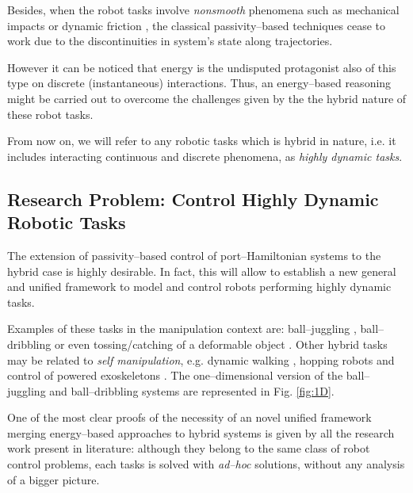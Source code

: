 %
Besides, when the robot tasks involve \textit{nonsmooth} phenomena such as mechanical impacts or dynamic friction \cite{brogliato1999nonsmooth}, the classical passivity--based techniques cease to work due to the discontinuities in system's state along trajectories. 

However it can be noticed that energy is the undisputed protagonist also of this type on discrete (instantaneous) interactions. Thus, an energy--based reasoning might be carried out to overcome the challenges given by the the hybrid nature of these robot tasks.  

From now on, we will refer to any robotic tasks which is hybrid in nature, i.e. it includes interacting continuous and discrete phenomena, as \textit{highly dynamic tasks}.
\subsection{Research Problem: Control Highly Dynamic Robotic Tasks}
%
The extension of passivity--based control of port--Hamiltonian systems to the hybrid case is highly desirable. In fact, this will allow to establish a new general and unified framework to model and control robots performing highly dynamic tasks.
%
\newline

%
Examples of these tasks in the manipulation context are:
ball--juggling \cite{sanfelice2007hybrid, tian2013}, ball--dribbling \cite{Batz2010, haddadin2018exploiting} or even tossing/catching of a deformable object \cite{ruggero2018}. 
Other hybrid tasks may be related to \textit{self manipulation}, e.g. dynamic walking \cite{spong2007,westervelt2018feedback}, hopping robots \cite{Ishikawa2003} and control of powered exoskeletons \cite{harib2018feedback,lv2018design}. The one--dimensional version of the ball--juggling and ball--dribbling systems are represented in Fig. \ref{fig:1D}.
%
\newline

%
One of the most clear proofs of the necessity of an novel unified framework merging energy--based approaches to hybrid systems is given by all the research work present in literature: although they belong to the same class of robot control problems, each tasks is solved with \textit{ad--hoc} solutions, without any analysis of a bigger picture.  
%
\newline

